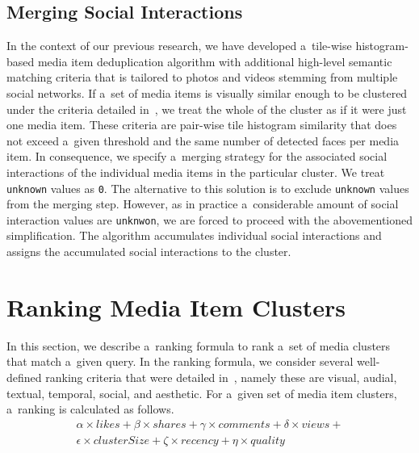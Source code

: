 \documentclass{sig-alt-release2}
\begin{document}
\subsection{Merging Social Interactions}
\label{sec:merging-social-interactions}

In the context of our previous research,
we have developed a~tile-wise histogram-based
media item deduplication algorithm
with additional high-level semantic matching criteria
that is tailored to photos and videos stemming from multiple social networks.
If a~set of media items is visually similar enough to be clustered
under the criteria detailed in~\cite{rizzo2012whatfresh},
we treat the whole of the cluster
as if it were just one media item.
These criteria are pair-wise tile histogram similarity 
that does not exceed a~given threshold
and the same number of detected faces per media item.
In consequence, we specify a~merging strategy
for the associated social interactions of the individual media items
in the particular cluster.
We treat \texttt{unknown} values as \texttt{0}.
The alternative to this solution is to exclude \texttt{unknown} values
from the merging step.
However, as in practice a~considerable amount of
social interaction values are \texttt{unknwon},
we are forced to proceed with the abovementioned simplification.
The algorithm accumulates individual social interactions
and assigns the accumulated social interactions to the cluster.

\section{Ranking Media Item Clusters}

In this section, we describe a~ranking formula to rank
a~set of media clusters that match a~given query.
In the ranking formula, we consider several well-defined ranking criteria
that were detailed in~\cite{steiner2012definingaesthetic},
namely these are visual, audial, textual, temporal, social, and aesthetic.
For a~given set of media item clusters, a~ranking is calculated as follows.
\vspace{-1em}
\begin{gather}
  \alpha \times \mathit{likes} + \beta \times \mathit{shares} +
  \gamma \times \mathit{comments} + \delta \times \mathit{views} + \nonumber\\
  \epsilon \times \mathit{clusterSize} + \zeta \times \mathit{recency} +
  \eta \times \mathit{quality}
\end{gather}
\end{document}

